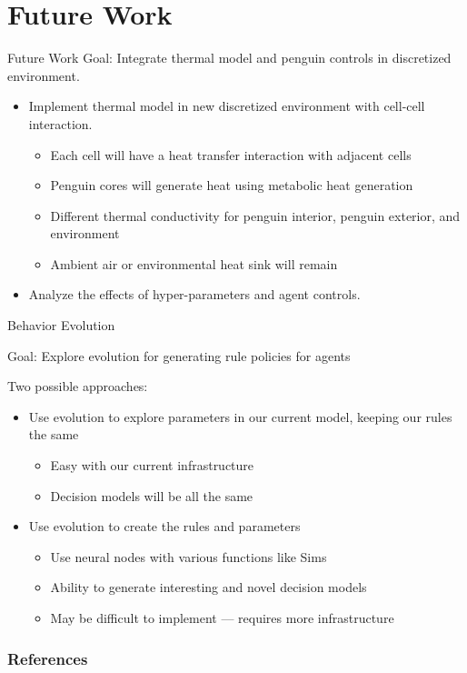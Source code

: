 \documentclass[handout,9pt]{beamer}
\begin{document}
\section{Future Work}
\begin{frame}{Future Work}
	Goal: Integrate thermal model and penguin controls in discretized environment.
	\begin{itemize}
		\item Implement thermal model in new discretized environment with cell-cell
			interaction.
			\begin{itemize}
				\item Each cell will have a heat transfer interaction with adjacent
					cells
				\item Penguin cores will generate heat using metabolic heat generation
				\item Different thermal conductivity for penguin interior, penguin
					exterior, and environment
				\item Ambient air or environmental heat sink will remain
			\end{itemize}
		\item Analyze the effects of hyper-parameters and agent controls.
	\end{itemize}
\end{frame}
\begin{frame}{Behavior Evolution}
	\par Goal: Explore evolution for generating rule policies for agents
	\vspace{12pt}
	\par Two possible approaches:
	\begin{itemize}
		\item Use evolution to explore parameters in our current model, keeping our
			rules the same
			\begin{itemize}
				\item Easy with our current infrastructure
				\item Decision models will be all the same
			\end{itemize}
		\item Use evolution to create the rules and parameters
			\begin{itemize}
				\item Use neural nodes with various functions like Sims
					\cite{simsEvolvingVirtualCreatures1994}
				\item Ability to generate interesting and novel decision models
				\item May be difficult to implement --- requires more infrastructure
			\end{itemize}
	\end{itemize}
\end{frame}

	\begin{frame}[allowframebreaks]
		\frametitle{References}
		\printbibliography
	\end{frame}
\end{document}
